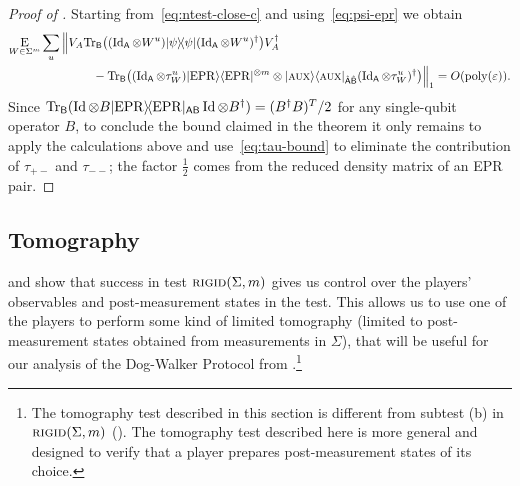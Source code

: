 \documentclass{toc}
\newcommand{\ket}[1]{|#1\rangle}
\newcommand{\bra}[1]{\langle#1|}
\newcommand{\proj}[1]{\ket{#1}\!\bra{#1}}
\newcommand{\Tr}{\mbox{\rm Tr}}
\newcommand{\Id}{\ensuremath{\mathop{\rm Id}\nolimits}}
\newcommand{\Es}[1]{\ensuremath{\mathop{\textsc{E}}}_{#1}} %
\DeclareMathOperator{\poly}{poly}
\newcommand{\reg}[1]{{\textsf{#1}}}
\newcommand{\eps}{\varepsilon}
\newcommand{\EPR}{{\rm EPR}}
\newcommand{\aux}{\textsc {aux}}
\newcommand{\rigid}{\textsc{rigid}}
\begin{document}
\begin{proof}[Proof of ]
Starting from~\eqref{eq:ntest-close-c} and using~\eqref{eq:psi-epr} we obtain 
\begin{align*}\Es{W\in\Sigma^{m}}\sum_{u} \Big\|& V_A\Tr_\reg{B}\big( (\Id_\reg{A} \otimes W^{u})\proj{\psi}(\Id_\reg{A} \otimes W^{u})^\dagger \big) V_A^\dagger \\
&\qquad- \Tr_\reg{B}\big( (\Id_\reg{A} \otimes \tau_W^{u})\ket{\EPR}\bra{\EPR}^{\otimes m} \otimes \ket{\aux}\bra{\aux}_{\hat{\reg{A}}\hat{\reg{B}}}(\Id_\reg{A} \otimes \tau_W^{u})^\dagger \big) \Big\|_1 = O(\poly(\eps)).
\end{align*}
Since $\Tr_{\reg{B}}( \Id \otimes B \proj{\EPR}_{\reg{AB}} \Id\otimes B^\dagger) = (B^\dagger B)^T/2$ for any single-qubit operator $B$, to conclude the bound claimed in the theorem it only remains to apply the calculations above and use~\eqref{eq:tau-bound} to eliminate the contribution of $\tau_{+-}$ and $\tau_{--}$; the factor $\frac{1}{2}$ comes from the reduced density matrix of an EPR pair.
\end{proof}


\subsection{Tomography}
\label{subsec:tomography}
\label{sec: TOM test}

 and  show that success in test $\rigid(\Sigma,m)$ gives us control over the players' observables and post-measurement states in the test. This allows us to use one of the players to perform some kind of limited tomography (limited to post-measurement states obtained from measurements in $\Sigma$), that will be useful for our analysis of the Dog-Walker Protocol from .\footnote{The tomography test described in this section is different from subtest (b) in $\rigid(\Sigma,m)$ (). The tomography test described here is more general and designed to verify that a player prepares post-measurement states of its choice.}
\end{document}
